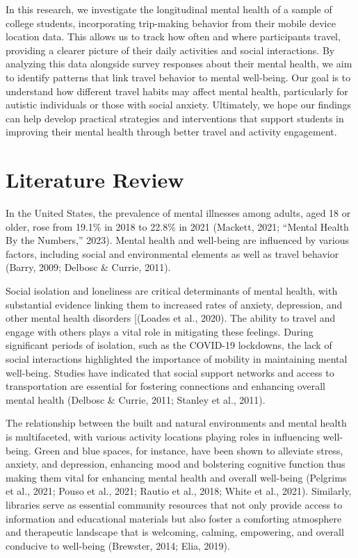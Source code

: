 \documentclass[
  letterpaper,
  number,
  review,
  3p]{elsarticle}
\begin{document}
In this research, we investigate the longitudinal mental health of a
sample of college students, incorporating trip-making behavior from
their mobile device location data. This allows us to track how often and
where participants travel, providing a clearer picture of their daily
activities and social interactions. By analyzing this data alongside
survey responses about their mental health, we aim to identify patterns
that link travel behavior to mental well-being. Our goal is to
understand how different travel habits may affect mental health,
particularly for autistic individuals or those with social anxiety.
Ultimately, we hope our findings can help develop practical strategies
and interventions that support students in improving their mental health
through better travel and activity engagement.


\section{Literature Review}\label{literature-review}

In the United States, the prevalence of mental illnesses among adults,
aged 18 or older, rose from 19.1\% in 2018 to 22.8\% in 2021 (Mackett,
2021; {``Mental {Health By} the {Numbers},''} 2023). Mental health and
well-being are influenced by various factors, including social and
environmental elements as well as travel behavior (Barry, 2009; Delbosc
\& Currie, 2011).

Social isolation and loneliness are critical determinants of mental
health, with substantial evidence linking them to increased rates of
anxiety, depression, and other mental health disorders {[}(Loades et
al., 2020). The ability to travel and engage with others plays a vital
role in mitigating these feelings. During significant periods of
isolation, such as the COVID-19 lockdowns, the lack of social
interactions highlighted the importance of mobility in maintaining
mental well-being. Studies have indicated that social support networks
and access to transportation are essential for fostering connections and
enhancing overall mental health (Delbosc \& Currie, 2011; Stanley et
al., 2011).

The relationship between the built and natural environments and mental
health is multifaceted, with various activity locations playing roles in
influencing well-being. Green and blue spaces, for instance, have been
shown to alleviate stress, anxiety, and depression, enhancing mood and
bolstering cognitive function thus making them vital for enhancing
mental health and overall well-being (Pelgrims et al., 2021; Pouso et
al., 2021; Rautio et al., 2018; White et al., 2021). Similarly,
libraries serve as essential community resources that not only provide
access to information and educational materials but also foster a
comforting atmosphere and therapeutic landscape that is welcoming,
calming, empowering, and overall conducive to well-being (Brewster,
2014; Elia, 2019).
\end{document}
